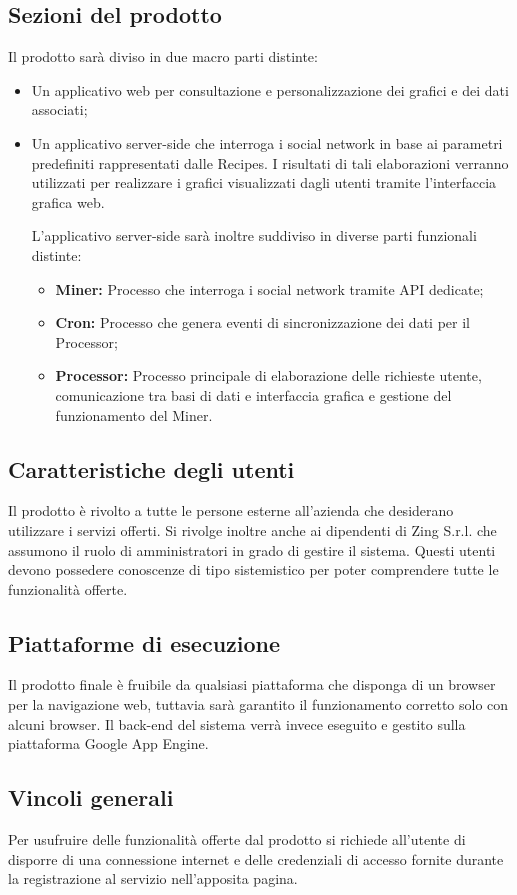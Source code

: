 \subsection{Sezioni del prodotto}
Il prodotto sarà diviso in due macro parti distinte:

\begin{itemize}
\item Un applicativo web per consultazione e personalizzazione dei grafici e dei dati associati;
\item Un applicativo server-side che interroga i social network in base ai parametri predefiniti rappresentati dalle Recipes. I risultati di tali elaborazioni verranno utilizzati per realizzare i grafici visualizzati dagli utenti tramite l'interfaccia grafica web.

L'applicativo server-side sarà inoltre suddiviso in diverse parti funzionali distinte:
\begin{itemize}
\item \textbf{Miner:} Processo che interroga i social network tramite API dedicate;
\item \textbf{Cron:} Processo che genera eventi di sincronizzazione dei dati per il Processor;
\item \textbf{Processor:} Processo principale di elaborazione delle richieste utente, comunicazione tra basi di dati e interfaccia grafica e gestione del funzionamento del Miner.
\end{itemize}

\end{itemize}

\subsection{Caratteristiche degli utenti}
Il prodotto è rivolto a tutte le persone esterne all'azienda che desiderano utilizzare i servizi offerti. 
Si rivolge inoltre anche ai dipendenti di Zing S.r.l. che assumono il ruolo di amministratori in grado di gestire il sistema.
Questi utenti devono possedere conoscenze di tipo sistemistico per poter comprendere tutte le funzionalità offerte.

\subsection{Piattaforme di esecuzione}
Il prodotto finale è fruibile da qualsiasi piattaforma che disponga di un browser per la navigazione web, tuttavia sarà garantito il funzionamento corretto solo con alcuni browser.
Il back-end del sistema verrà invece eseguito e gestito sulla piattaforma Google App Engine.

\subsection{Vincoli generali}
Per usufruire delle funzionalità offerte dal prodotto si richiede all'utente di disporre
di una connessione internet e delle credenziali di accesso fornite durante la registrazione al servizio nell'apposita pagina.
